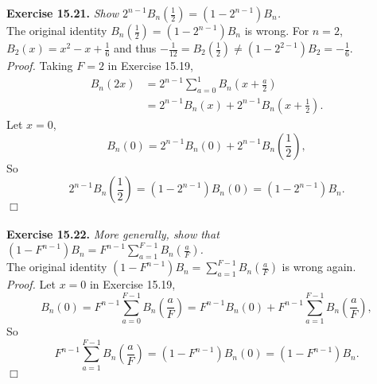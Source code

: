 \documentclass{article}
\begin{document}
\textbf{Exercise 15.21.}
\emph{Show $2^{n-1} B_n(\frac{1}{2}) = (1 - 2^{n-1})B_n$.} \\

The original identity $B_n(\frac{1}{2}) = (1 - 2^{n-1})B_n$ is wrong.
For $n = 2$, $B_2(x) = x^2 - x + \frac{1}{6}$ and thus
$-\frac{1}{12} = B_2(\frac{1}{2}) \neq (1 - 2^{2-1})B_2 = -\frac{1}{6}$. \\

\emph{Proof.}
Taking $F = 2$ in Exercise 15.19,
\begin{align*}
B_n(2x)
&= 2^{n-1} \sum_{a = 0}^{1} B_n\left( x + \frac{a}{2} \right) \\
&= 2^{n-1} B_n(x) + 2^{n-1} B_n\left( x + \frac{1}{2} \right).
\end{align*}
Let $x = 0$,
$$B_n(0) = 2^{n-1} B_n(0) + 2^{n-1} B_n\left( \frac{1}{2} \right), $$
So
$$2^{n-1} B_n\left( \frac{1}{2} \right)
= (1 - 2^{n-1}) B_n(0)
= (1 - 2^{n-1}) B_n.$$
$\Box$ \\\\



\textbf{Exercise 15.22.}
\emph{More generally, show that
$(1 - F^{n-1})B_n = F^{n-1} \sum_{a=1}^{F-1} B_n(\frac{a}{F})$.} \\

The original identity $(1 - F^{n-1})B_n = \sum_{a=1}^{F-1} B_n(\frac{a}{F})$
is wrong again. \\

\emph{Proof.}
Let $x = 0$ in Exercise 15.19,
$$B_n(0)
= F^{n-1} \sum_{a=0}^{F-1} B_n\left( \frac{a}{F} \right)
= F^{n-1} B_n(0) + F^{n-1} \sum_{a=1}^{F-1} B_n\left( \frac{a}{F} \right), $$
So
$$F^{n-1} \sum_{a=1}^{F-1} B_n\left( \frac{a}{F} \right)
= (1 - F^{n-1}) B_n(0)
= (1 - F^{n-1}) B_n.$$
$\Box$ \\\\
\end{document}
